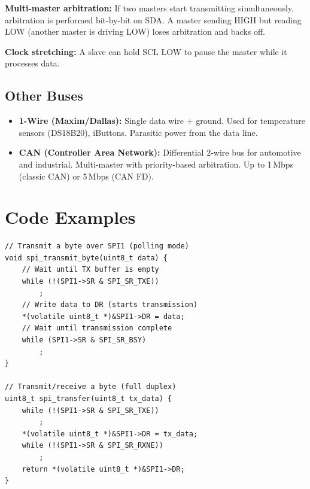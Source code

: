 \textbf{Multi-master arbitration:} If two masters start transmitting simultaneously, arbitration is performed bit-by-bit on SDA. A master sending HIGH but reading LOW (another master is driving LOW) loses arbitration and backs off.

\textbf{Clock stretching:} A slave can hold SCL LOW to pause the master while it processes data.

\subsection{Other Buses}

\begin{itemize}
  \item \textbf{1-Wire (Maxim/Dallas):} Single data wire + ground. Used for temperature sensors (DS18B20), iButtons. Parasitic power from the data line.
  \item \textbf{CAN (Controller Area Network):} Differential 2-wire bus for automotive and industrial. Multi-master with priority-based arbitration. Up to 1\,Mbps (classic CAN) or 5\,Mbps (CAN FD).
\end{itemize}

\section{Code Examples}
\label{sec:io:code}

\begin{lstlisting}[style=C, caption={STM32 HAL-style SPI transmit.}]
// Transmit a byte over SPI1 (polling mode)
void spi_transmit_byte(uint8_t data) {
    // Wait until TX buffer is empty
    while (!(SPI1->SR & SPI_SR_TXE))
        ;
    // Write data to DR (starts transmission)
    *(volatile uint8_t *)&SPI1->DR = data;
    // Wait until transmission complete
    while (SPI1->SR & SPI_SR_BSY)
        ;
}

// Transmit/receive a byte (full duplex)
uint8_t spi_transfer(uint8_t tx_data) {
    while (!(SPI1->SR & SPI_SR_TXE))
        ;
    *(volatile uint8_t *)&SPI1->DR = tx_data;
    while (!(SPI1->SR & SPI_SR_RXNE))
        ;
    return *(volatile uint8_t *)&SPI1->DR;
}
\end{lstlisting}

